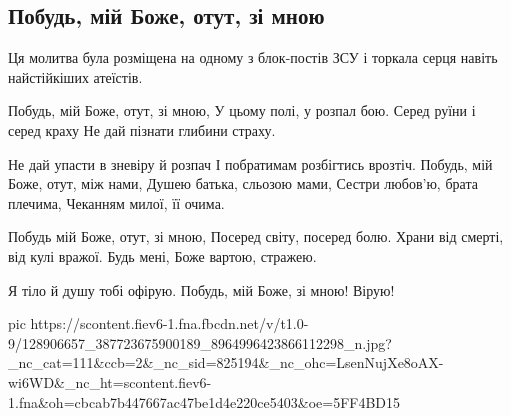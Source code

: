  
 
 
 
 

\subsection{Побудь, мій Боже, отут, зі мною}
\label{sec:01_12_2020.fb.patrioty_ukrainy.1.pobud_mij_bozhe}

Ця молитва була розміщена на одному з блок-постів ЗСУ і торкала серця навіть найстійкіших атеїстів.

\begin{multicols}{2}
	\obeycr
Побудь, мій Боже, отут, зі мною,
У цьому полі, у розпал бою.
Серед руїни і серед краху
Не дай пізнати глибини страху.

Не дай упасти в зневіру й розпач
І побратимам розбігтись врозтіч.
Побудь, мій Боже, отут, між нами,
Душею батька, сльозою мами,
Сестри любов'ю, брата плечима,
Чеканням милої, її очима.

Побудь мій Боже, отут, зі мною,
Посеред світу, посеред болю.
Храни від смерті, від кулі вражої.
Будь мені, Боже вартою, стражею.

Я тіло й душу тобі офірую.
Побудь, мій Боже, зі мною! Вірую!
	\restorecr
\end{multicols}

\ifcmt
pic https://scontent.fiev6-1.fna.fbcdn.net/v/t1.0-9/128906657_387723675900189_8964996423866112298_n.jpg?_nc_cat=111&ccb=2&_nc_sid=825194&_nc_ohc=LsenNujXe8oAX-wi6WD&_nc_ht=scontent.fiev6-1.fna&oh=cbcab7b447667ac47be1d4e220ce5403&oe=5FF4BD15
\fi
